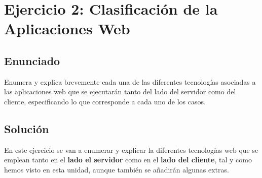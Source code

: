 \section{Ejercicio 2: Clasificación de la Aplicaciones Web}
\subsection{Enunciado}
Enumera y explica brevemente cada una de las diferentes tecnologías asociadas a las aplicaciones web que se ejecutarán tanto del lado del servidor como del cliente, especificando lo que corresponde a cada uno de los casos.

\subsection{Solución}
En este ejercicio se van a enumerar y explicar la diferentes tecnologías web que se emplean tanto en el \textbf{lado el servidor} como en el \textbf{lado del cliente}, tal y como hemos visto en esta unidad, aunque también se añadirán algunas extras.

